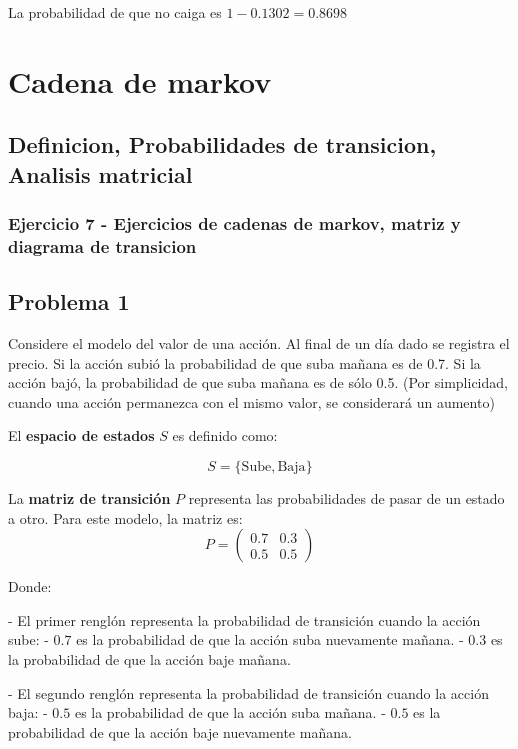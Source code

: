\documentclass{article}
\begin{document}
La probabilidad de que no caiga es $1-0.1302 = 0.8698$

\newpage

\section{Cadena de markov}

\subsection{Definicion, Probabilidades de transicion, Analisis matricial}

\subsubsection{Ejercicio 7 - Ejercicios de cadenas de markov, matriz y diagrama de transicion}

\subsection*{Problema 1}

Considere el modelo del valor de una acción. Al final de un día dado se registra el precio. Si la acción subió la probabilidad de que suba mañana es de 0.7. Si la acción bajó, la probabilidad de que suba mañana es de sólo 0.5. (Por simplicidad, cuando una acción permanezca con el mismo valor, se considerará un aumento)

El \textbf{espacio de estados} \( S \) es definido como:

\[ S = \{ \text{Sube}, \text{Baja} \} \]

La \textbf{matriz de transición} \( P \) representa las probabilidades de pasar de un estado a otro. Para este modelo, la matriz es:
\[ P = \begin{pmatrix} 0.7 & 0.3 \\ 0.5 & 0.5 \end{pmatrix} \]

Donde:

- El primer renglón representa la probabilidad de transición cuando la acción sube:
- $0.7$ es la probabilidad de que la acción suba nuevamente mañana.
- $0.3$ es la probabilidad de que la acción baje mañana.

- El segundo renglón representa la probabilidad de transición cuando la acción baja:
- $0.5$ es la probabilidad de que la acción suba mañana.
- $0.5$ es la probabilidad de que la acción baje nuevamente mañana.
\end{document}

